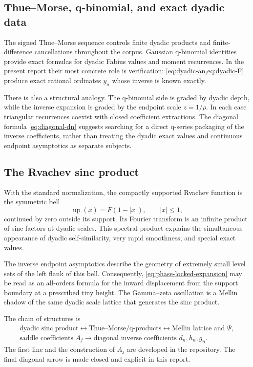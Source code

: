 \documentclass[11pt,oneside]{article}
\numberwithin{equation}{section}
\theoremstyle{definition}
\theoremstyle{remark}
\begin{document}
\subsection{Thue--Morse, q-binomial, and exact dyadic data}
The signed Thue--Morse sequence controls finite dyadic products and finite-difference cancellations throughout the corpus.  Gaussian q-binomial identities provide exact formulas for dyadic Fabius values and moment recurrences.  In the present report their most concrete role is verification: \cref{eq:dyadic-an,eq:dyadic-F} produce exact rational ordinates $y_n$ whose inverse is known exactly.

There is also a structural analogy.  The q-binomial side is graded by dyadic depth, while the inverse expansion is graded by the endpoint scale $z=1/\rho$.  In each case triangular recurrences coexist with closed coefficient extractions.  The diagonal formula \cref{eq:diagonal-dn} suggests searching for a direct q-series packaging of the inverse coefficients, rather than treating the dyadic exact values and continuous endpoint asymptotics as separate subjects.

\subsection{The Rvachev sinc product}
With the standard normalization, the compactly supported Rvachev function is the symmetric bell
\begin{equation}
 \operatorname{up}(x)=F(1-|x|),
 \qquad |x|\le1,
 \label{eq:up-F-relation}
\end{equation}
continued by zero outside its support.  Its Fourier transform is an infinite product of sinc factors at dyadic scales.  This spectral product explains the simultaneous appearance of dyadic self-similarity, very rapid smoothness, and special exact values.

The inverse endpoint asymptotics describe the geometry of extremely small level sets of the left flank of this bell.  Consequently, \cref{eq:phase-locked-expansion} may be read as an all-orders formula for the inward displacement from the support boundary at a prescribed tiny height.  The Gamma--zeta oscillation is a Mellin shadow of the same dyadic scale lattice that generates the sinc product.

\begin{statusbox}
The chain of structures is
\[
 \begin{gathered}
 \text{dyadic sinc product}
 \longleftrightarrow \text{Thue--Morse/q-products}
 \longleftrightarrow \text{Mellin lattice and }\Psi,\\[0.25em]
 \text{saddle coefficients }A_j
 \longrightarrow \text{diagonal inverse coefficients }d_n,h_n,g_n.
 \end{gathered}
\]
The first line and the construction of $A_j$ are developed in the repository.  The final diagonal arrow is made closed and explicit in this report.
\end{statusbox}
\end{document}
